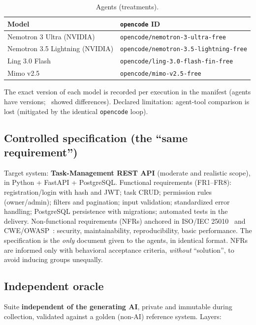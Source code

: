 \documentclass[11pt]{article}
\begin{document}
\begin{table}[htbp]
  \centering
  \caption{Agents (treatments).}
  \label{tab:agents}
  \begin{tabular}{ll}
    \toprule
    Model & \texttt{opencode} ID \\
    \midrule
    Nemotron 3 Ultra (NVIDIA) & \texttt{opencode/nemotron-3-ultra-free} \\
    Nemotron 3.5 Lightning (NVIDIA) & \texttt{opencode/nemotron-3.5-lightning-free} \\
    Ling 3.0 Flash & \texttt{opencode/ling-3.0-flash-fin-free} \\
    Mimo v2.5 & \texttt{opencode/mimo-v2.5-free} \\
    \bottomrule
  \end{tabular}
\end{table}

The exact version of each model is recorded per execution in the manifest (agents have versions;~\cite{F05} showed differences). Declared limitation: agent-tool comparison is lost (mitigated by the identical \texttt{opencode} loop).

\subsection{Controlled specification (the ``same requirement'')}

Target system: \textbf{Task-Management REST API} (moderate and realistic scope), in Python + FastAPI + PostgreSQL. Functional requirements (FR1--FR8): registration/login with hash and JWT; task CRUD; permission rules (owner/admin); filters and pagination; input validation; standardized error handling; PostgreSQL persistence with migrations; automated tests in the delivery. Non-functional requirements (NFRs) anchored in ISO/IEC 25010~\cite{D04} and CWE/OWASP~\cite{E01,E02,E03}: security, maintainability, reproducibility, basic performance. The specification is the \emph{only} document given to the agents, in identical format. NFRs are informed only with behavioral acceptance criteria, \emph{without} ``solution'', to avoid inducing groups unequally.

\subsection{Independent oracle}

Suite \textbf{independent of the generating AI}, private and immutable during collection, validated against a golden (non-AI) reference system. Layers:
\end{document}
